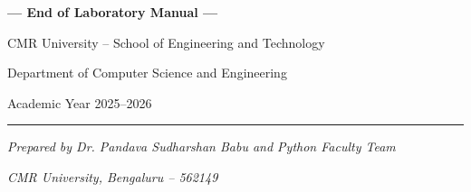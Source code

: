\documentclass[12pt,a4paper]{article}
\begin{document}
\begin{center}
\vspace*{3cm}
{\Large\bfseries\color{cmrdark} --- End of Laboratory Manual ---}

\vspace{1cm}

{\large CMR University -- School of Engineering and Technology}

\vspace{0.5cm}

{\large Department of Computer Science and Engineering}

\vspace{0.5cm}

{\large Academic Year 2025--2026}

\vspace{2cm}

\rule{0.6\textwidth}{1pt}

\vspace{0.5cm}

{\normalsize\textit{Prepared by Dr. Pandava Sudharshan Babu and Python Faculty Team}}

\vspace{0.3cm}

{\normalsize\textit{CMR University, Bengaluru -- 562149}}
\end{center}
\end{document}
